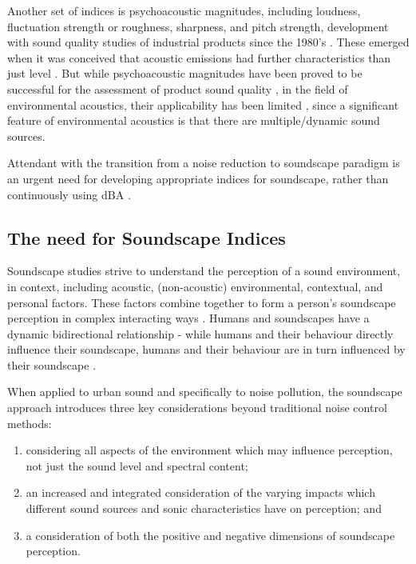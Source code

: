 \documentclass[
  authoryear,
  preprint,
  3p]{elsarticle}
\providecommand{\tightlist}{%
  \setlength{\itemsep}{0pt}\setlength{\parskip}{0pt}}\usepackage{longtable,booktabs,array}
\begin{document}
Another set of indices is psychoacoustic magnitudes, including loudness,
fluctuation strength or roughness, sharpness, and pitch strength,
development with sound quality studies of industrial products since the
1980's \citep{xii}. These emerged when it was conceived that acoustic
emissions had further characteristics than just level \citep{ciii}. But
while psychoacoustic magnitudes have been proved to be successful for
the assessment of product sound quality \citep{xiv}, in the field of
environmental acoustics, their applicability has been limited
\citep{xv}, since a significant feature of environmental acoustics is
that there are multiple/dynamic sound sources.

Attendant with the transition from a noise reduction to soundscape
paradigm is an urgent need for developing appropriate indices for
soundscape, rather than continuously using dBA \citep{xvi}.

\subsection{The need for Soundscape
Indices}\label{the-need-for-soundscape-indices}

Soundscape studies strive to understand the perception of a sound
environment, in context, including acoustic, (non-acoustic)
environmental, contextual, and personal factors. These factors combine
together to form a person's soundscape perception in complex interacting
ways \citep{Berglund2006Soundscape}. Humans and soundscapes have a
dynamic bidirectional relationship - while humans and their behaviour
directly influence their soundscape, humans and their behaviour are in
turn influenced by their soundscape
\citep{Erfanian2019Psychophysiological}.

When applied to urban sound and specifically to noise pollution, the
soundscape approach introduces three key considerations beyond
traditional noise control methods:

\begin{enumerate}
\def\labelenumi{\arabic{enumi}.}
\tightlist
\item
  considering all aspects of the environment which may influence
  perception, not just the sound level and spectral content;
\item
  an increased and integrated consideration of the varying impacts which
  different sound sources and sonic characteristics have on perception;
  and
\item
  a consideration of both the positive and negative dimensions of
  soundscape perception.
\end{enumerate}
\end{document}
